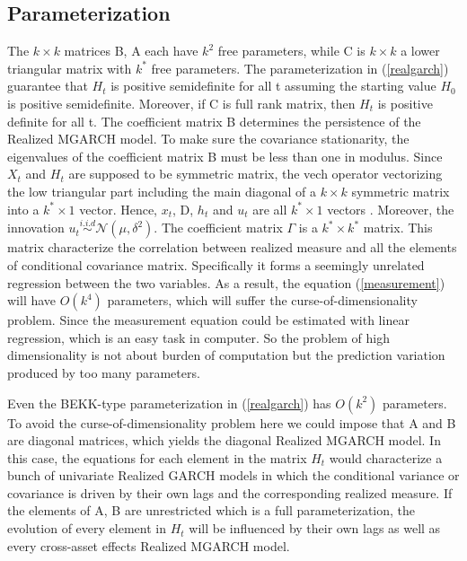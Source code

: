 \documentclass[titlepage,11pt]{article}
\begin{document}
\subsection{Parameterization}
The $k \times k$ matrices B, A each have $k^2$ free parameters, while C is $k \times k$ a lower triangular matrix with $k^*$ free parameters. The parameterization in (\ref{realgarch}) guarantee that $ H_t$ is positive semidefinite for all t assuming the starting value $H_0$ is positive semidefinite. Moreover, if C is full rank matrix, then $H_t$ is positive definite for all t. The coefficient matrix B determines the persistence of the Realized MGARCH model. To make sure the covariance stationarity, the eigenvalues of the coefficient matrix B must be less than one in modulus. 
Since $ X_t$ and $ H_t$ are supposed to be symmetric matrix, the vech operator vectorizing the low triangular part including the main diagonal of a $k \times k$ symmetric matrix into a $k^* \times 1$ vector. Hence, $x_t$, D, $h_t$ and $u_t$ are all  $k^* \times 1$ vectors . Moreover, the innovation $u_t \overset{i.i.d} {\sim} \mathcal{N}(\mu,\delta^2)$. The coefficient matrix $\Gamma$ is a $k^* \times k^*$ matrix.  This matrix characterize the correlation between realized measure and all the elements of conditional covariance matrix. Specifically it forms a seemingly unrelated regression between the two variables. As a result, the equation (\ref{measurement}) will have $O(k^4)$ parameters, which will suffer the curse-of-dimensionality problem. Since the measurement equation could be estimated with linear regression, which is an easy task in computer. So the problem of high dimensionality is not about  burden of computation but the prediction variation produced by too many parameters.

Even the BEKK-type parameterization in (\ref{realgarch}) has $O(k^2)$ parameters. To avoid the curse-of-dimensionality problem here we could impose that A and B are diagonal matrices, which yields the diagonal Realized MGARCH model. In this case, the equations for each element in the matrix $H_t$ would characterize a bunch of univariate Realized GARCH models in which the conditional variance or covariance is driven by their own lags and the corresponding realized measure. If the elements of A, B are unrestricted which is a full parameterization, the evolution of every element in $H_t$ will be influenced by their own lags as well as every cross-asset effects Realized MGARCH model. 
\end{document}
